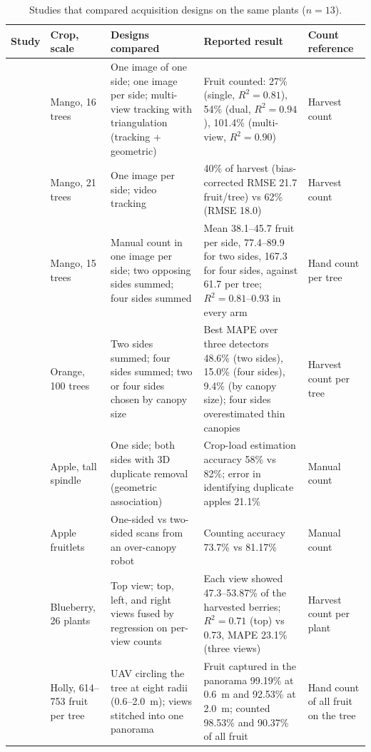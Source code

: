 \begin{table}[!t]
\centering
\caption{Studies that compared acquisition designs on the same plants ($n=13$).}\label{tab:acq}
\footnotesize
\begin{tabularx}{\textwidth}{@{}L{2.6cm}L{1.6cm}L{2.9cm}YL{2.4cm}@{}}
\toprule
Study & Crop, scale & Designs compared & Reported result & Count reference\\
\midrule
\citet{stein2016image} & Mango, 16 trees & One image of one side; one image per side; multi-view tracking with triangulation (tracking + geometric) & Fruit counted: 27\% (single, $R^2=0.81$), 54\% (dual, $R^2=0.94$), 101.4\% (multi-view, $R^2=0.90$) & Harvest count\\
\citet{wang2019mango} & Mango, 21 trees & One image per side; video tracking & 40\% of harvest (bias-corrected RMSE 21.7 fruit/tree) vs 62\% (RMSE 18.0) & Harvest count\\
\citet{payne2013estimation} & Mango, 15 trees & Manual count in one image per side; two opposing sides summed; four sides summed & Mean 38.1--45.7 fruit per side, 77.4--89.9 for two sides, 167.3 for four sides, against 61.7 per tree; $R^2=0.81$--0.93 in every arm & Hand count per tree\\
\citet{mirhaji2021fruit} & Orange, 100 trees & Two sides summed; four sides summed; two or four sides chosen by canopy size & Best MAPE over three detectors 48.6\% (two sides), 15.0\% (four sides), 9.4\% (by canopy size); four sides overestimated thin canopies & Harvest count per tree\\
\citet{gongal2016apple} & Apple, tall spindle & One side; both sides with 3D duplicate removal (geometric association) & Crop-load estimation accuracy 58\% vs 82\%; error in identifying duplicate apples 21.1\% & Manual count\\
\citet{qureshi2023seeing} & Apple fruitlets & One-sided vs two-sided scans from an over-canopy robot & Counting accuracy 73.7\% vs 81.17\% & Manual count\\
\citet{li2025field} & Blueberry, 26 plants & Top view; top, left, and right views fused by regression on per-view counts & Each view showed 47.3--53.87\% of the harvested berries; $R^2=0.71$ (top) vs 0.73, MAPE 23.1\% (three views) & Harvest count per plant\\
\citet{zhang2022complete} & Holly, 614--753 fruit per tree & UAV circling the tree at eight radii (0.6--2.0~m); views stitched into one panorama & Fruit captured in the panorama 99.19\% at 0.6~m and 92.53\% at 2.0~m; counted 98.53\% and 90.37\% of all fruit & Hand count of all fruit on the tree\\

\end{tabularx}
\end{table}
